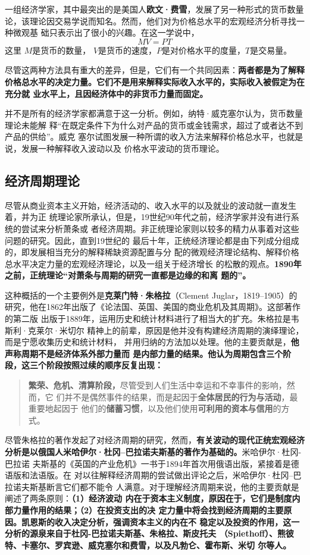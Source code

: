一组经济学家，其中最突出的是美国人\textbf{欧文·费雪}，发展了另一种形式的货币数量
论，该理论因交易学说而知名。然而，他们对为价格总水平的宏观经济分析寻找一种微观基
础只表示出了很小的兴趣。在这一学说中，
\[ MV = PT \]
这里 $M$是货币的数量， $V$是货币的速度，$P$是对价格水平的度量，$T$是交易量。

尽管这两种方法具有重大的差异，但是，它们有一个共同因素：\textbf{两者都是为了解释
  价格总水平的决定力量。它们不是用来解释实际收入水平的，实际收入被假定为在充分就
  业水平上，且因经济体中的非货币力量而固定。}

并不是所有的经济学家都满意于这一分析。例如，纳特·威克塞尔认为，货币数量理论未能解
释“在既定条件下为什么对产品的货币或金钱需求，超过了或者达不到产品的供给”。威克
塞尔试图发展一种所谓的收入方法来解释价格总水平，也就是说，发展一种解释收入波动以及
价格水平波动的货币理论。

\subsection{经济周期理论}

尽管从商业资本主义开始，经济活动的、收入水平的以及就业的波动就一直发生着，并为正
统理论家所承认，但是，19世纪90年代之前，经济学家并没有进行系统的尝试来分析萧条或
者经济周期。非正统理论家则以较多的精力从事着对这些问题的研究。因此，直到19世纪的
最后十年，正统经济理论都是由下列成分组成的，即发展相当充分的解释稀缺资源配置与分
配的微观经济理论结构、解释价格总水平决定力量的宏观经济理论，以及一组关于经济增长
的松散的观点。\textbf{1890年之前，正统理论“对萧条与周期的研究一直都是边缘的和离
  题的”。}

这种概括的一个主要例外是\textbf{克莱门特·朱格拉}（Clement Juglar，1819--1905）的
研究，他在1862年出版了《论法国、英国、美国的商业危机及其周期》。这部著作的第二版
出版于1889年，运用历史和统计材料进行了相当大的扩充。朱格拉是韦斯利·克莱尔·米切尔
精神上的前辈，原因是他并没有构建经济周期的演绎理论，而是宁愿收集历史和统计材料，
并用归纳的方法加以处理。他的主要贡献是，\textbf{他声称周期不是经济体系外部力量而
  是内部力量的结果。他认为周期包含三个阶段，这三个阶段按照过续的顺序反复出现：}

\begin{quotation}
  \textbf{繁荣、危机、清算阶段，}尽管受到人们生活中幸运和不幸事件的影响，然而，它
  们并不是偶然事件的结果，而是起因于\textbf{全体居民的行为与活动}，最重要地起因于
  他们的\textbf{储蓄习惯}，以及他们使用\textbf{可利用的资本与信用}的方式。
\end{quotation}

尽管朱格拉的著作发起了对经济周期的研究，然而，\textbf{有关波动的现代正统宏观经济
  分析是以俄国人米哈伊尔·杜冈--巴拉诺夫斯基的著作为基础的。}米哈伊尔·杜冈-巴拉诺
夫斯基的《英国的产业危机》一书于1894年首次用俄语出版，紧接着是德语版和法语版。在
对以往解释经济周期的尝试做出评论之后，米哈伊尔·杜冈--巴拉诺夫斯基断言它们都不能令
人满意。对于理解经济周期来说，他的主要贡献是阐述了两条原则：\textbf{（1）经济波动
  内在于资本主义制度，原因在于，它们是制度内部力量作用的结果；（2）在投资支出的决
  定力量中将会找到经济周期的主要原因。凯恩斯的收入决定分析，强调资本主义的内在不
  稳定以及投资的作用，这一分析的源泉来自于杜冈-巴拉诺夫斯基、朱格拉、斯皮托夫
  （Spiethoff）、熊彼特、卡塞尔、罗宾逊、威克塞尔和费雪，以及凡勃仑、霍布斯、米切
  尔等人。}

